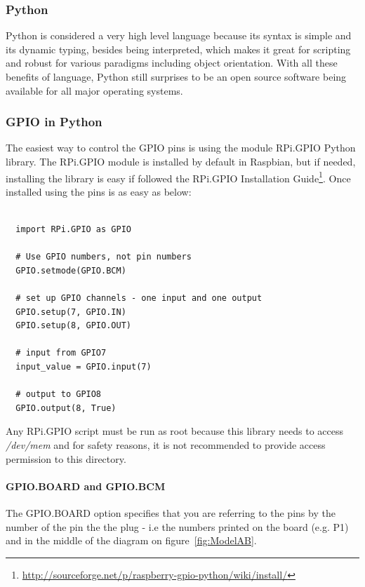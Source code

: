 \documentclass{acm_proc_article-sp}
\begin{document}
\subsubsection{Python}
Python is considered a very high level language because its syntax is simple and its dynamic typing, besides being interpreted, which makes it great for scripting and robust for various paradigms including object orientation. With all these benefits of language, Python still surprises to be an open source software being available for all major operating systems\cite{dearduino}.

\subsubsection{GPIO in Python}
The easiest way to control the GPIO pins is using the module RPi.GPIO Python library. The RPi.GPIO module is installed by default in Raspbian, but if needed, installing the library is easy if followed the RPi.GPIO Installation Guide\footnote{\url{http://sourceforge.net/p/raspberry-gpio-python/wiki/install/}}. Once installed using the pins is as easy as below: 


\renewcommand{\theFancyVerbLine}{
  \sffamily\textcolor[rgb]{0.5,0.5,0.5}{\scriptsize\arabic{FancyVerbLine}}}
\begin{verbatim}

  import RPi.GPIO as GPIO

  # Use GPIO numbers, not pin numbers
  GPIO.setmode(GPIO.BCM) 

  # set up GPIO channels - one input and one output
  GPIO.setup(7, GPIO.IN) 
  GPIO.setup(8, GPIO.OUT)

  # input from GPIO7
  input_value = GPIO.input(7)

  # output to GPIO8
  GPIO.output(8, True)
\end{verbatim}

Any RPi.GPIO script must be run as root because this library needs to access \textit{/dev/mem} and for safety reasons, it is not recommended to provide access permission to this directory.


\paragraph{GPIO.BOARD and GPIO.BCM}
The GPIO.BOARD option specifies that you are referring to the pins by the number of the pin the the plug - i.e the numbers printed on the board (e.g. P1) and in the middle of the diagram on figure~\ref{fig:ModelAB}.
\end{document}
